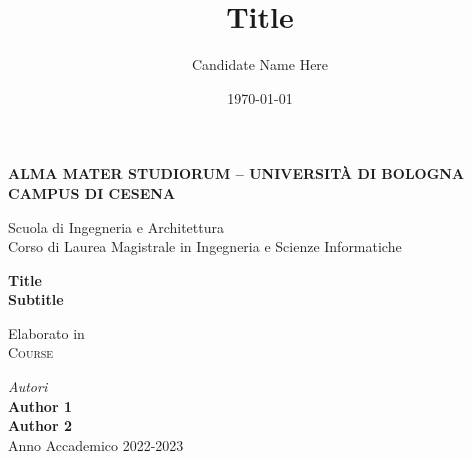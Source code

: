 \title{Title}
\author{Candidate Name Here}
\date{\today}

\begin{titlepage}
	\begin{center}
		
		\large
		\textbf{ALMA MATER STUDIORUM -- UNIVERSITÀ DI BOLOGNA \\ CAMPUS DI CESENA}
		\\
		\noindent\hrulefill
		\vspace{0.4cm}
		
		\Large
		Scuola di Ingegneria e Architettura \\
		Corso di Laurea Magistrale in Ingegneria e Scienze Informatiche
		
		\Huge
		\vspace{4cm}
		\textbf{
			Title
			\\
			Subtitle
			\\
		}
		
		\large
		\vspace{1cm}
		Elaborato in 
		\\
		\textsc{Course}
		
		\vspace{5.5cm}
		\textit{Autori} 
				\\ 
				\textbf{Author 1}
				\\
				\textbf{Author 2}
		\vfill
		\noindent\hrulefill
		\vspace{0.3cm}
		\Large
		\\
		Anno Accademico 2022-2023
	\end{center}
\end{titlepage}
\restoregeometry